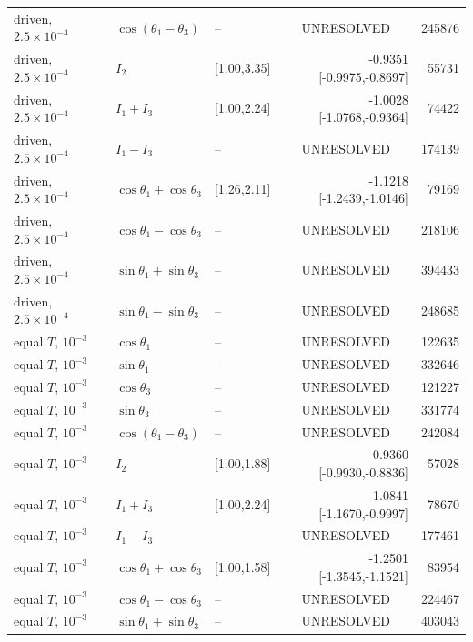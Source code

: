 \begin{longtable}{lllrr}
driven, $2.5\!\times\!10^{-4}$ & $\cos(\theta_1-\theta_3)$ & -- & \multicolumn{1}{c}{UNRESOLVED} & 245876 \\
driven, $2.5\!\times\!10^{-4}$ & $I_2$ & [1.00,3.35] & -0.9351 [-0.9975,-0.8697] & 55731 \\
driven, $2.5\!\times\!10^{-4}$ & $I_1+I_3$ & [1.00,2.24] & -1.0028 [-1.0768,-0.9364] & 74422 \\
driven, $2.5\!\times\!10^{-4}$ & $I_1-I_3$ & -- & \multicolumn{1}{c}{UNRESOLVED} & 174139 \\
driven, $2.5\!\times\!10^{-4}$ & $\cos\theta_1+\cos\theta_3$ & [1.26,2.11] & -1.1218 [-1.2439,-1.0146] & 79169 \\
driven, $2.5\!\times\!10^{-4}$ & $\cos\theta_1-\cos\theta_3$ & -- & \multicolumn{1}{c}{UNRESOLVED} & 218106 \\
driven, $2.5\!\times\!10^{-4}$ & $\sin\theta_1+\sin\theta_3$ & -- & \multicolumn{1}{c}{UNRESOLVED} & 394433 \\
driven, $2.5\!\times\!10^{-4}$ & $\sin\theta_1-\sin\theta_3$ & -- & \multicolumn{1}{c}{UNRESOLVED} & 248685 \\
\addlinespace
equal $T$, $10^{-3}$ & $\cos\theta_1$ & -- & \multicolumn{1}{c}{UNRESOLVED} & 122635 \\
equal $T$, $10^{-3}$ & $\sin\theta_1$ & -- & \multicolumn{1}{c}{UNRESOLVED} & 332646 \\
equal $T$, $10^{-3}$ & $\cos\theta_3$ & -- & \multicolumn{1}{c}{UNRESOLVED} & 121227 \\
equal $T$, $10^{-3}$ & $\sin\theta_3$ & -- & \multicolumn{1}{c}{UNRESOLVED} & 331774 \\
equal $T$, $10^{-3}$ & $\cos(\theta_1-\theta_3)$ & -- & \multicolumn{1}{c}{UNRESOLVED} & 242084 \\
equal $T$, $10^{-3}$ & $I_2$ & [1.00,1.88] & -0.9360 [-0.9930,-0.8836] & 57028 \\
equal $T$, $10^{-3}$ & $I_1+I_3$ & [1.00,2.24] & -1.0841 [-1.1670,-0.9997] & 78670 \\
equal $T$, $10^{-3}$ & $I_1-I_3$ & -- & \multicolumn{1}{c}{UNRESOLVED} & 177461 \\
equal $T$, $10^{-3}$ & $\cos\theta_1+\cos\theta_3$ & [1.00,1.58] & -1.2501 [-1.3545,-1.1521] & 83954 \\
equal $T$, $10^{-3}$ & $\cos\theta_1-\cos\theta_3$ & -- & \multicolumn{1}{c}{UNRESOLVED} & 224467 \\
equal $T$, $10^{-3}$ & $\sin\theta_1+\sin\theta_3$ & -- & \multicolumn{1}{c}{UNRESOLVED} & 403043 \\

\end{longtable}
